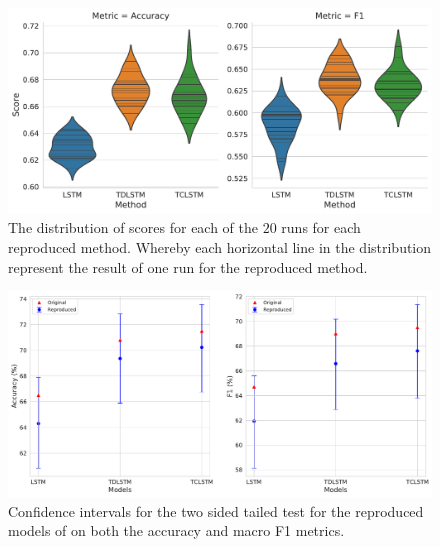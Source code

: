 \begin{figure}[!h]
    \centering
    \includegraphics[scale=0.4]{images/reproducibility/tang/LSTM_DIST_ACC_F1.pdf}
    \caption{The distribution of scores for each of the $20$ runs for each reproduced method. Whereby each horizontal line in the distribution represent the result of one run for the reproduced method.}
    \label{fig:repro_tang_LSTM_DIST_ACC_F1}
\end{figure}

\begin{figure}[!h]
    \centering
    \includegraphics[scale=0.4]{images/reproducibility/tang/LSTM_ACC_F1.pdf}
    \caption{Confidence intervals for the two sided tailed test for the reproduced models of \citet{tang-etal-2016-effective} on both the accuracy and macro F1 metrics.}
    \label{fig:repro_tang_LSTM_ACC_F1}
\end{figure}

